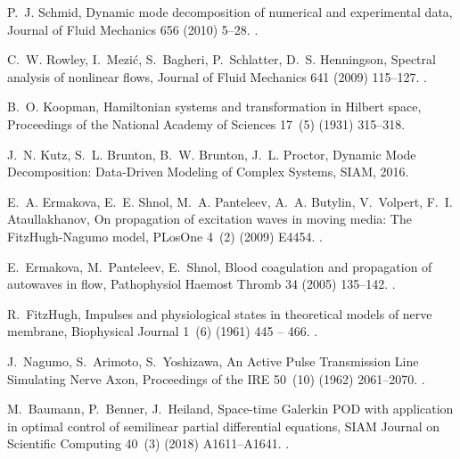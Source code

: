 \documentclass[preprint,12pt]{elsarticle}
\begin{document}
\begin{thebibliography}{10}
P.~J. Schmid, Dynamic mode decomposition of numerical and experimental data,
  Journal of Fluid Mechanics 656 (2010) 5--28.
\newblock \href {https://doi.org/10.1017/S0022112010001217}
  {}.

C.~W. Rowley, I.~Mezi{\'c}, S.~Bagheri, P.~Schlatter, D.~S. Henningson,
  Spectral analysis of nonlinear flows, Journal of Fluid Mechanics 641 (2009)
  115--127.
\newblock \href {https://doi.org/10.1017/S0022112009992059}
  {}.

B.~O. Koopman, Hamiltonian systems and transformation in {H}ilbert space,
  Proceedings of the National Academy of Sciences 17~(5) (1931) 315--318.

J.~N. Kutz, S.~L. Brunton, B.~W. Brunton, J.~L. Proctor, {Dynamic Mode
  Decomposition: Data-Driven Modeling of Complex Systems}, {SIAM}, 2016.

E.~A. Ermakova, E.~E. Shnol, M.~A. Panteleev, A.~A. Butylin, V.~Volpert, F.~I.
  Ataullakhanov, On propagation of excitation waves in moving media: The
  {FitzHugh-Nagumo} model, {PLosOne} 4~(2) (2009) E4454.
\newblock \href {https://doi.org/10.1371/journal.pone.0004454}
  {}.

E.~Ermakova, M.~Panteleev, E.~Shnol, Blood coagulation and propagation of
  autowaves in flow, {Pathophysiol Haemost Thromb} 34 (2005) 135--142.
\newblock \href {https://doi.org/10.1159/000089933}
  {}.

R.~FitzHugh, Impulses and physiological states in theoretical models of nerve
  membrane, Biophysical Journal 1~(6) (1961) 445 -- 466.
\newblock \href {https://doi.org/10.1016/S0006-3495(61)86902-6}
  {}.

J.~Nagumo, S.~Arimoto, S.~Yoshizawa, {An Active Pulse Transmission Line
  Simulating Nerve Axon}, Proceedings of the IRE 50~(10) (1962) 2061--2070.
\newblock \href {https://doi.org/10.1109/jrproc.1962.288235}
  {}.

M.~Baumann, P.~Benner, J.~Heiland, Space-time {Galerkin} {POD} with application
  in optimal control of semilinear partial differential equations, SIAM Journal
  on Scientific Computing 40~(3) (2018) A1611--A1641.
\newblock \href {https://doi.org/10.1137/17M1135281}
  {}.


\end{thebibliography}
\end{document}
